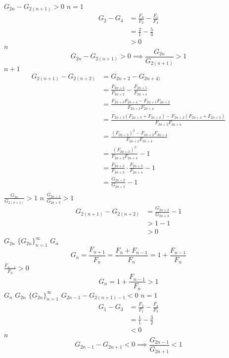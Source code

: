 \documentclass{article}
\begin{document}
$G_{2n} - G_{2(n+1)} > 0$
$n = 1$
\begin{align*}
    G_2 - G_4 &= \frac{F_3}{F_2} - \frac{F_5}{F_4}\\
    &= \frac{2}{1} - \frac{5}{3}\\
    &> 0
\end{align*}
$n$
\begin{equation*}
    G_{2n} - G_{2(n+1)} > 0 \implies \frac{G_{2n}}{G_{2(n+1)}} > 1
\end{equation*}
$n+1$
\begin{align*}
    G_{2(n+1)} - G_{2(n+2)} &= G_{2n + 2} - G_{2n+4)}\\
    &= \frac{F_{2n+3}}{F_{2n+2}} - \frac{F_{2n+5}}{F_{2n+4}}\\
    &= \frac{F_{2n+3}F_{2n+4} - F_{2n+5}F_{2n+2}}{F_{2n+2}F_{2n+4}}\\
    &= \frac{F_{2n+3}(F_{2n+3}+F_{2n+2}) - F_{2n+2}(F_{2n+4}+F_{2n+3})}{F_{2n+2}F_{2n+4}}\\
    &= \frac{(F_{2n+3})^2 - F_{2n+2}F_{2n+4}}{F_{2n+2}F_{2n+4}}\\
    &= \frac{(F_{2n+3})^2}{F_{2n+2}F_{2n+4}} - 1\\
    &= \frac{F_{2n+3}}{F_{2n+2}} \cdot \frac{F_{2n+3}}{F_{2n+4}} -1\\
    &= \frac{G_{2n+2}}{G_{2n+3}} - 1\\
\end{align*}
$\frac{G_{2n}}{G_{2(n+1)}} > 1$
$n$
$\frac{G_{2n+2}}{G_{2n+3}} > 1$
\begin{align*}
    G_{2(n+1)} - G_{2(n+2)} &= \frac{G_{2n+2}}{G_{2n+3}} - 1\\
    &> 1 -1\\
    &> 0
\end{align*}
$G_{2n}$
$\{G_{2n}\}_{n=1}^\infty$
$G_n$
\begin{equation*}
    G_n = \frac{F_{n+1}}{F_n} =  \frac{F_n + F_{n-1}}{F_n} = 1 + \frac{F_{n-1}}{F_n}
\end{equation*}
$\frac{F_{n-1}}{F_n} > 0$
\begin{equation*}
    G_n = 1 + \frac{F_{n-1}}{F_n} > 1
\end{equation*}
$G_n$
$G_{2n}$
$\{G_{2n}\}_{n=1}^\infty$
$G_{2n-1} - G_{2(n+1)-1} < 0$
$n = 1$
\begin{align*}
    G_1 - G_3 &= \frac{F_2}{F_1} - \frac{F_4}{F_3}\\
    &= \frac{1}{1} - \frac{3}{2}\\
    &< 0
\end{align*}
$n$
\begin{equation*}
    G_{2n-1} - G_{2n+1} < 0 \implies \frac{G_{2n-1}}{G_{2n+1}} < 1
\end{equation*}
\end{document}
